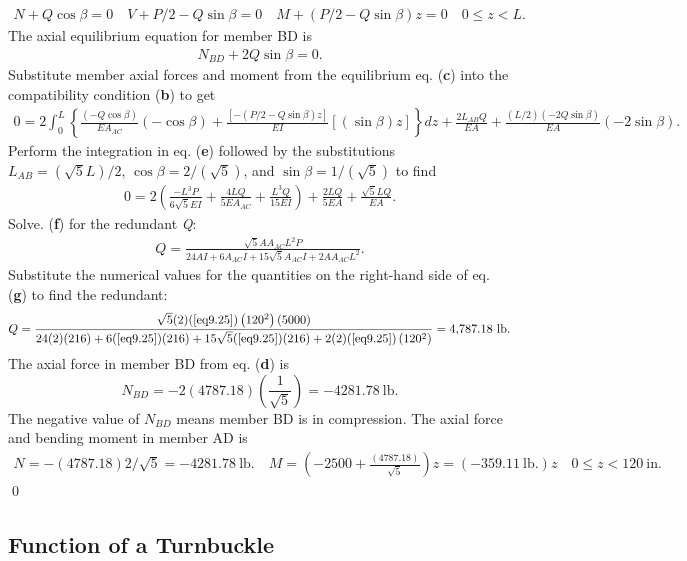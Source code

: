 \documentclass{AeroStructure-ERJohnson}
\begin{document}
\begin{example*}
\begin{align}
N+Q \cos \beta=0 \quad V+P / 2-Q \sin \beta=0 \quad M+(P / 2-Q \sin \beta) z=0 \quad 0 \leq z<L.
\end{align}
The axial equilibrium equation for member BD is
\begin{align}
N_{B D}+2 Q \sin \beta=0.
\end{align}
Substitute member axial forces and moment from the equilibrium eq. (\textbf{c}) into the compatibility condition (\textbf{b}) to get
\begin{align}
0=2 \int_{0}^{L}\left\{\frac{(-Q \cos \beta)}{E A_{A C}}(-\cos \beta)+\frac{[-(P / 2-Q \sin \beta) z]}{E I}[(\sin \beta) z]\right\} d z+\frac{2 L_{A B} Q}{E A}+\frac{(L / 2)(-2 Q \sin \beta)}{E A}(-2 \sin \beta).
\end{align}
Perform the integration in eq. (\textbf{e}) followed by the substitutions $L_{A B}=(\sqrt{5} L) / 2$, $\cos \beta=2 /(\sqrt{5})$, and $\sin \beta=1 /(\sqrt{5})$ to find
\begin{align}
0=2\left(\frac{-L^{3} P}{6 \sqrt{5} E I}+\frac{4 L Q}{5 E A_{A C}}+\frac{L^{3} Q}{15 E I}\right)+\frac{2 L Q}{5 E A}+\frac{\sqrt{5} L Q}{E A}.
\end{align}
Solve. (\textbf{f}) for the redundant \textit{Q}:
\begin{align}
Q=\frac{\sqrt{5} A A_{A C} L^{2} P}{24 A I+6 A_{A C} I+15 \sqrt{5} A_{A C} I+2 A A_{A C} L^{2}}.
\end{align}
Substitute the numerical values for the quantities on the right-hand side of eq. (\textbf{g}) to find the redundant:
\begin{align}
Q=\frac{\sqrt{5}(2)(\ref{eq9.25})\left(120^{2}\right)(5000)}{24(2)(216)+6(\ref{eq9.25})(216)+15 \sqrt{5}(\ref{eq9.25})(216)+2(2)(\ref{eq9.25})\left(120^{2}\right)}=4{,}787.18~\mathrm{lb}.
\end{align}
The axial force in member BD from eq. ({\bf d}) is
\[
N_{B D}=-2(4787.18)\left(\frac{1}{\sqrt{5}}\right)=-4281.78~\mathrm{lb}.
\]
The negative value of $N_{B D}$ means member BD is in compression. The axial force and bending moment in member AD is
\begin{align}
N=-(4787.18) 2 / \sqrt{5}=-4281.78~\mathrm{lb} . \quad M=\left(-2500+\frac{(4787.18)}{\sqrt{5}}\right) z=(-359.11~\mathrm{lb} .) z \quad 0 \leq z<120~\mathrm{in.}
\end{align}\hfill\qed
\end{example*}

\vspace*{-1pc}

\subsection{Function of a Turnbuckle}\label{sec6.4.1}
\end{document}
